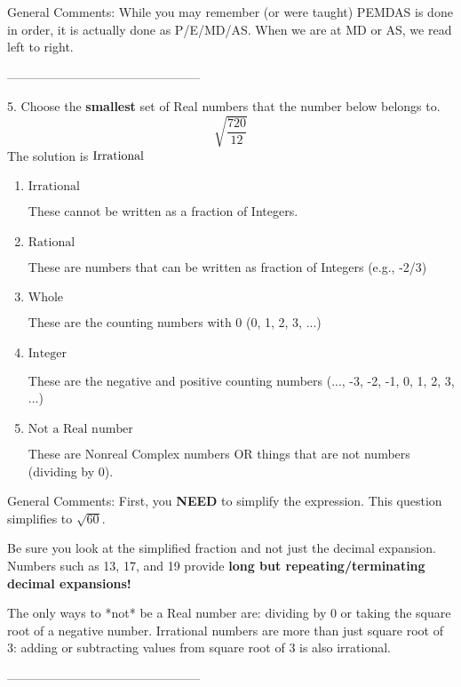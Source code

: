 \documentclass{extbook}[14pt]
\begin{document}
General Comments: While you may remember (or were taught) PEMDAS is done in order, it is actually done as P/E/MD/AS. When we are at MD or AS, we read left to right.

-----------------------------------------------

5. Choose the \textbf{smallest} set of Real numbers that the number below belongs to.
\[ \sqrt{\frac{720}{12}} \] 
The solution is $ \text{\text{Irrational}} $ 

\begin{enumerate}[label=\Alph*.] 
\item $ \text{Irrational} $ 

 These cannot be written as a fraction of Integers. 
\item $ \text{Rational} $ 

 These are numbers that can be written as fraction of Integers (e.g., -2/3) 
\item $ \text{Whole} $ 

 These are the counting numbers with 0 (0, 1, 2, 3, ...) 
\item $ \text{Integer} $ 

 These are the negative and positive counting numbers (..., -3, -2, -1, 0, 1, 2, 3, ...) 
\item $ \text{Not a Real number} $ 

 These are Nonreal Complex numbers OR things that are not numbers (dividing by 0). 
\end{enumerate} 
 
General Comments: First, you \textbf{NEED} to simplify the expression. This question simplifies to $\sqrt{60}$. 
 
 Be sure you look at the simplified fraction and not just the decimal expansion. Numbers such as 13, 17, and 19 provide \textbf{long but repeating/terminating decimal expansions!} 
 
 The only ways to *not* be a Real number are: dividing by 0 or taking the square root of a negative number. Irrational numbers are more than just square root of 3: adding or subtracting values from square root of 3 is also irrational.

-----------------------------------------------
\end{document}
